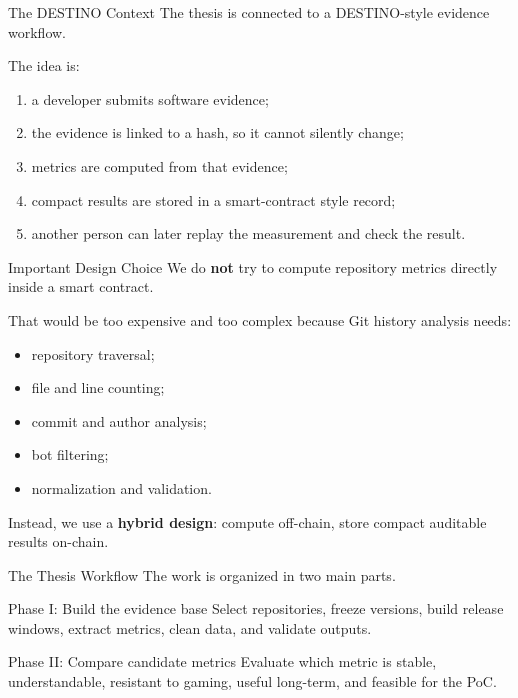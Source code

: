 \documentclass[aspectratio=169,11pt]{beamer}
\begin{document}
\begin{frame}{The DESTINO Context}
  The thesis is connected to a DESTINO-style evidence workflow.

  \vspace{0.2cm}
  The idea is:
  \begin{enumerate}
    \item a developer submits software evidence;
    \item the evidence is linked to a hash, so it cannot silently change;
    \item metrics are computed from that evidence;
    \item compact results are stored in a smart-contract style record;
    \item another person can later replay the measurement and check the result.
  \end{enumerate}
\end{frame}

\begin{frame}{Important Design Choice}
  We do \textbf{not} try to compute repository metrics directly inside a smart contract.

  \vspace{0.3cm}
  That would be too expensive and too complex because Git history analysis needs:
  \begin{itemize}
    \item repository traversal;
    \item file and line counting;
    \item commit and author analysis;
    \item bot filtering;
    \item normalization and validation.
  \end{itemize}

  \vspace{0.3cm}
  Instead, we use a \textbf{hybrid design}: compute off-chain, store compact auditable results on-chain.
\end{frame}

\begin{frame}{The Thesis Workflow}
  The work is organized in two main parts.

  \vspace{0.3cm}
  \begin{block}{Phase I: Build the evidence base}
    Select repositories, freeze versions, build release windows, extract metrics, clean data, and validate outputs.
  \end{block}

  \begin{block}{Phase II: Compare candidate metrics}
    Evaluate which metric is stable, understandable, resistant to gaming, useful long-term, and feasible for the PoC.
  \end{block}
\end{frame}
\end{document}
